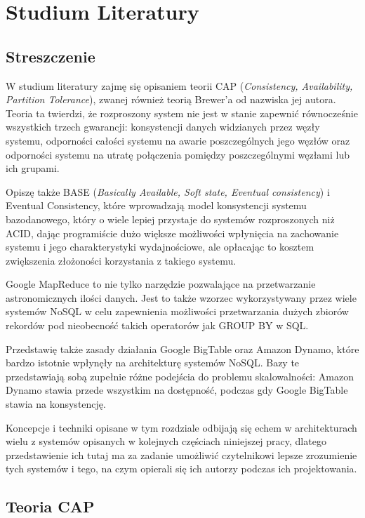 \chapter{Studium Literatury}

\section*{Streszczenie}

W studium literatury zajmę się opisaniem teorii CAP (\emph{Consistency, Availability, Partition Tolerance}), zwanej również teorią Brewer'a od nazwiska jej autora. 
Teoria ta twierdzi, że rozproszony system nie jest w stanie zapewnić równocześnie wszystkich trzech gwarancji: konsystencji danych widzianych przez węzły systemu, odporności całości systemu na awarie poszczególnych jego węzłów oraz odporności systemu na utratę połączenia pomiędzy poszczególnymi węzłami lub ich grupami. 

Opiszę także BASE (\emph{Basically Available, Soft state, Eventual consistency}) i Eventual Consistency, które wprowadzają model konsystencji systemu bazodanowego, który o wiele lepiej przystaje do systemów rozproszonych niż ACID, dając programiście dużo większe możliwości wpłynięcia na zachowanie systemu i jego charakterystyki wydajnościowe, ale opłacając to kosztem zwiększenia złożoności korzystania z takiego systemu.

Google MapReduce to nie tylko narzędzie pozwalające na przetwarzanie astronomicznych ilości danych.
Jest to także wzorzec wykorzystywany przez wiele systemów NoSQL w celu zapewnienia możliwości przetwarzania dużych zbiorów rekordów pod nieobecność takich operatorów jak GROUP BY w SQL.

Przedstawię także zasady działania Google BigTable oraz Amazon Dynamo, które bardzo istotnie wpłynęły na architekturę systemów NoSQL. 
Bazy te przedstawiają sobą zupełnie różne podejścia do problemu skalowalności: Amazon Dynamo stawia przede wszystkim na dostępność, podczas gdy Google BigTable stawia na konsystencję.

Koncepcje i techniki opisane w tym rozdziale odbijają się echem w architekturach wielu z systemów opisanych w kolejnych częściach niniejszej pracy, dlatego przedstawienie ich tutaj ma za zadanie umożliwić czytelnikowi lepsze zrozumienie tych systemów i tego, na czym opierali się ich autorzy podczas ich projektowania.

\section{Teoria CAP}

